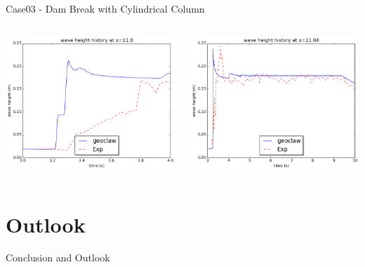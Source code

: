 \documentclass[xcolor=dvipsnames]{beamer}
\begin{document}
\begin{frame}[label=sec-5-4]{Case03 - Dam Break with Cylindrical Column}
\begin{columns}
\begin{column}{0.5\textwidth}
\begin{block}{}
\includegraphics[width=.9\linewidth]{../paper/plots/waveheight_cylinder_x11.png} \\
\end{block}
\end{column}

\begin{column}{0.5\textwidth}
\begin{block}{}
\includegraphics[width=.9\linewidth]{../paper/plots/waveheight_cylinder_x1104_largerTimeScale.png}  \\
\vskip5mm
\end{block}
\end{column}
\end{columns}
\end{frame}
\section{Outlook}
\label{sec-6}
\begin{frame}[label=sec-6-1]{Conclusion and Outlook}
\end{frame}
\end{document}
